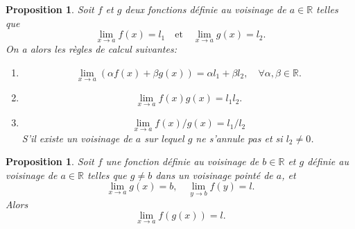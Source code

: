 \documentclass[oneside,12pt,french,table]{book}
\theoremstyle{definition}
\theoremstyle{plain}
\newtheorem{proposition}[definition]{Proposition}
\theoremstyle{remark}
\newcommand{\Rr}{{\mathbb{R}}}
\begin{document}
\begin{proposition}
    Soit $f$ et $g$ deux fonctions définie au voisinage de $a\in \Rr$ telles que \[
    \lim_{x\rightarrow a }f(x)=l_1 \quad \text{et} \quad \lim_{x\rightarrow a }g(x)=l_2.
    \]
    On a alors les règles de calcul suivantes:
    \begin{enumerate}
        \item \[
        \lim_{x\rightarrow a }(\alpha f(x) +\beta g(x))=\alpha l_1+\beta l_2, \quad\forall\alpha,\beta\in\Rr .
        \]
        \item \[
        \lim_{x\rightarrow a }f(x)g(x)=l_1l_2.
        \]
        \item $$
        \lim_{x\rightarrow a }f(x)/g(x)=l_1/l_2 $$
        S'il existe un voisinage de $a$ sur lequel $g$ ne s'annule pas et si $l_2\neq 0$.
        
    \end{enumerate}
\end{proposition}
\begin{proposition}
    Soit $f$ une fonction définie au voisinage de $b\in\Rr$ et $g$ définie au voisinage de $a\in\Rr$ telles que $g\neq b$ dans un voisinage pointé de $a$, et 
    \[
    \lim_{x\rightarrow a}g(x)=b, \quad \lim_{y\rightarrow b}f(y)=l.
    \]
    Alors
    \[
    \lim_{x\rightarrow a}f(g(x))=l.
    \]
\end{proposition}
\end{document}
